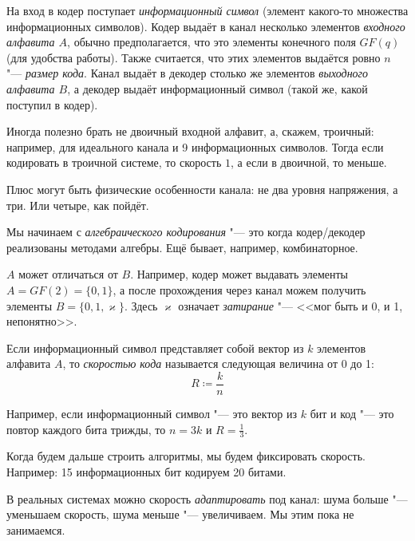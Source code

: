 \begin{Def}
	На вход в кодер поступает \textit{информационный символ} (элемент какого-то множества информационных символов).
	Кодер выдаёт в канал несколько элементов \textit{входного алфавита $A$}, обычно предполагается,
	что это элементы конечного поля $GF(q)$ (для удобства работы).
	Также считается, что этих элементов выдаётся ровно $n$ "--- \textit{размер кода}.
	Канал выдаёт в декодер столько же элементов \textit{выходного алфавита $B$}, а декодер выдаёт информационный символ
	(такой же, какой поступил в кодер).
\end{Def}
\begin{Rem}
	Иногда полезно брать не двоичный входной алфавит, а, скажем, троичный:
	например, для идеального канала и 9 информационных символов.
	Тогда если кодировать в троичной системе, то скорость $1$, а если в двоичной, то меньше.
\end{Rem}
\begin{Rem}
	Плюс могут быть физические особенности канала: не два уровня напряжения, а три.
	Или четыре, как пойдёт.
\end{Rem}
\begin{Rem}
	Мы начинаем с \textit{алгебраического кодирования} "--- это когда кодер/декодер реализованы
	методами алгебры.
	Ещё бывает, например, комбинаторное.
\end{Rem}

\begin{exmp}
	$A$ может отличаться от $B$.
	Например, кодер может выдавать элементы $A=GF(2)=\{0, 1\}$,
	а после прохождения через канал можем получить элементы $B=\{0, 1, \varkappa\}$.
	Здесь $\varkappa$ означает \textit{затирание} "--- <<мог быть и 0, и 1, непонятно>>.
\end{exmp}

\begin{Def}
	Если информационный символ представляет собой вектор из $k$ элементов алфавита $A$,
	то \textit{скоростью кода} называется следующая величина от 0 до 1:
	\[
		R \coloneqq \frac{k}{n}
	\]
\end{Def}
\begin{exmp}
	Например, если информационный символ "--- это вектор из $k$ бит
	и код "--- это повтор каждого бита трижды, то $n=3k$ и $R=\frac13$.
\end{exmp}
\begin{Rem}
	Когда будем дальше строить алгоритмы, мы будем фиксировать скорость.
	Например: 15 информационных бит кодируем 20 битами.
\end{Rem}
\begin{Rem}
	В реальных системах можно скорость \textit{адаптировать} под канал:
	шума больше "--- уменьшаем скорость, шума меньше "--- увеличиваем.
	Мы этим пока не занимаемся.
\end{Rem}

